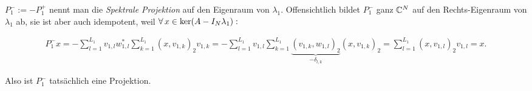 \begin{remark}
    
    $P_1^- := -P_1^+$ nennt man die \textit{Spektrale Projektion} auf den Eigenraum von $\lambda_1$.
    Offensichtlich bildet $P_1^-$ ganz $\mathbb{C}^N$ auf den Rechts-Eigenraum von $\lambda_1$ ab, sie ist aber auch idempotent, weil $\forall \, x \in \operatorname{ker}(A - I_N \lambda_1):$

    \begin{align*}
        P_1^- x
        =
        -\sum_{l=1}^{L_1}
            v_{1, l}
            w_{1, l}^\ast
            \sum_{k=1}^{L_1}
                (x, v_{1, k})_2
                v_{1, k}
        =
        -\sum_{l=1}^{L_1}
            v_{1, l}
            \sum_{k=1}^{L_1}
                \underbrace{(v_{1, k}, w_{1, l})_2}_{-\delta_{l, k}}
                (x, v_{1, k})_2
        =
        \sum_{l=1}^{L_1}
            (x, v_{1, l})_2
            v_{1, l}
        =
        x.
    \end{align*}

    Also ist $P_1^-$ tatsächlich eine Projektion.

\end{remark}

